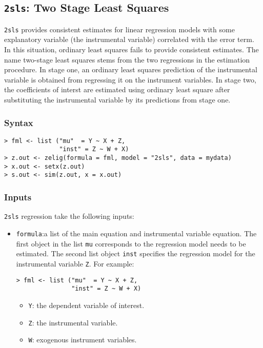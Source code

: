 \subsection{\texttt{2sls}: Two Stage Least Squares}
\label{2sls}
\texttt{2sls} provides consistent estimates for linear regression models with 
some explanatory variable (the instrumental variable) 
correlated with the error term. 
In this situation, ordinary least squares fails to provide consistent 
estimates. The name two-stage least squares stems from the two regressions 
in the estimation procedure. In stage one, an ordinary least squares 
prediction of the instrumental variable is obtained from regressing it on
the instrument variables. In stage two, the coefficients of interst are 
estimated using ordinary least square after substituting the instrumental 
variable by its predictions from stage one. 

\subsubsection{Syntax}
\begin{verbatim}
> fml <- list ("mu"  = Y ~ X + Z,
               "inst" = Z ~ W + X)
> z.out <- zelig(formula = fml, model = "2sls", data = mydata)
> x.out <- setx(z.out)
> s.out <- sim(z.out, x = x.out)
\end{verbatim}
\subsubsection{Inputs}
\texttt{2sls} regression take the following inputs:
\begin{itemize}
\item \texttt{formula}:a list of the main equation and instrumental variable 
equation. The first object in the list \texttt{mu} corresponds to the 
regression model needs to be estimated. The second list object \texttt{inst} 
specifies the regression model for the instrumental variable \texttt{Z}.
For example:
\begin{verbatim}
> fml <- list ("mu"  = Y ~ X + Z,
               "inst" = Z ~ W + X)
\end{verbatim}
\begin{itemize}
\item \texttt{Y}: the dependent variable of interest.
\item \texttt{Z}: the instrumental variable.
\item \texttt{W}: exogenous instrument variables.
\end{itemize}
\end{itemize}
